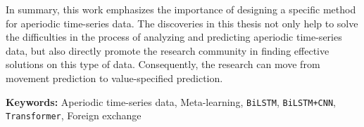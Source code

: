In summary, this work emphasizes the importance of designing a specific method for aperiodic time-series data. The discoveries in this thesis not only help to solve the difficulties in the process of analyzing and predicting aperiodic time-series data, but also directly promote the research community in finding effective solutions on this type of data. Consequently, the research can move from movement prediction to value-specified prediction.


\vspace{5mm}
\noindent
\textbf{Keywords:} Aperiodic time-series data, Meta-learning, \verb|BiLSTM|, \verb|BiLSTM+CNN|, \verb|Transformer|, Foreign exchange

